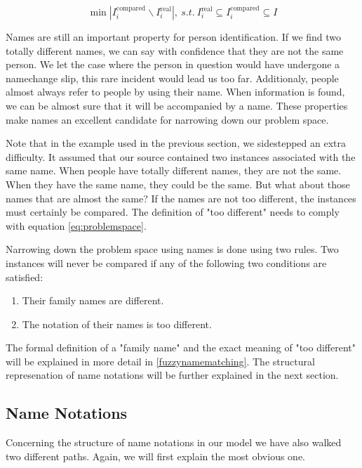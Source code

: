 \begin{equation}
\min |I^\text{compared}_i\backslash I^\text{real}_i|,\ s.t.\ I^\text{real}_i \subseteq I^\text{compared}_i \subseteq I
\label{eq:problemspace}
\end{equation}

Names are still an important property for person identification. If we find two totally different names, we can say with confidence that they are not the same person. We let the case where the person in question would have undergone a namechange slip, this rare incident would lead us too far. Additionaly, people almost always refer to people by using their name. When information is found, we can be almost sure that it will be accompanied by a name. These properties make names an excellent candidate for narrowing down our problem space.

Note that in the example used in the previous section, we sidestepped an extra difficulty. It assumed that our source contained two instances associated with the same name. When people have totally different names, they are not the same. When they have the same name, they could be the same. But what about those names that are almost the same? If the names are not too different, the instances must certainly be compared. The definition of "too different" needs to comply with equation \autoref{eq:problemspace}.

Narrowing down the problem space using names is done using two rules. Two instances will never be compared if any of the following two conditions are satisfied:

\begin{enumerate}
\item Their family names are different.
\item The notation of their names is too different.
\end{enumerate}

The formal definition of a "family name" and the exact meaning of "too different" will be explained in more detail in \autoref{fuzzynamematching}. The structural represenation of name notations will be further explained in the next section.

\subsection{Name Notations}

Concerning the structure of name notations in our model we have also walked two different paths. Again, we will first explain the most obvious one. 

